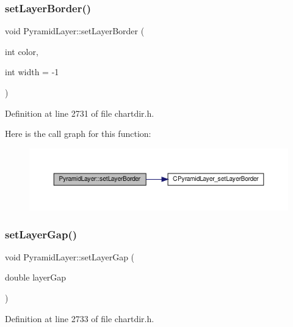 \subsubsection{\texorpdfstring{set\+Layer\+Border()}{setLayerBorder()}}
{\footnotesize\ttfamily void Pyramid\+Layer\+::set\+Layer\+Border (\begin{DoxyParamCaption}\item[{int}]{color,  }\item[{int}]{width = {\ttfamily -\/1} }\end{DoxyParamCaption})\hspace{0.3cm}{\ttfamily [inline]}}



Definition at line 2731 of file chartdir.\+h.

Here is the call graph for this function\+:
\nopagebreak
\begin{figure}[H]
\begin{center}
\leavevmode
\includegraphics[width=350pt]{class_pyramid_layer_a0501abd3ffb21f08fc4f57f6cb6c2d62_cgraph}
\end{center}
\end{figure}
\mbox{\label{class_pyramid_layer_abece35f4e8b47f64c7d7fa1ed45d4281}} 
\subsubsection{\texorpdfstring{set\+Layer\+Gap()}{setLayerGap()}}
{\footnotesize\ttfamily void Pyramid\+Layer\+::set\+Layer\+Gap (\begin{DoxyParamCaption}\item[{double}]{layer\+Gap }\end{DoxyParamCaption})\hspace{0.3cm}{\ttfamily [inline]}}



Definition at line 2733 of file chartdir.\+h.

